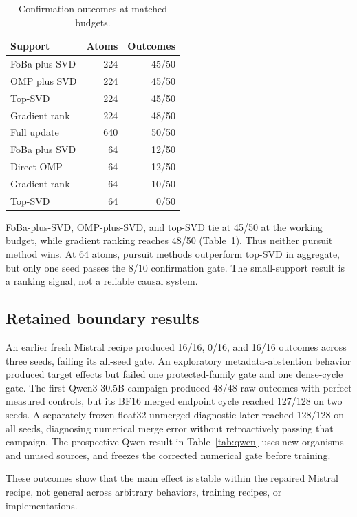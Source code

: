 \documentclass[10pt,twocolumn]{article}
\begin{document}
\begin{table}[t]
\centering
\small
\caption{Confirmation outcomes at matched budgets.}
\label{tab:selectors}
\begin{tabular}{lrr}
\toprule
Support & Atoms & Outcomes \\
\midrule
FoBa plus SVD & 224 & 45/50 \\
OMP plus SVD & 224 & 45/50 \\
Top-SVD & 224 & 45/50 \\
Gradient rank & 224 & 48/50 \\
Full update & 640 & 50/50 \\
\midrule
FoBa plus SVD & 64 & 12/50 \\
Direct OMP & 64 & 12/50 \\
Gradient rank & 64 & 10/50 \\
Top-SVD & 64 & 0/50 \\
\bottomrule
\end{tabular}
\end{table}

FoBa-plus-SVD, OMP-plus-SVD, and top-SVD tie at 45/50 at the working budget, while gradient ranking reaches 48/50 (Table~\ref{tab:selectors}). Thus neither pursuit method wins. At 64 atoms, pursuit methods outperform top-SVD in aggregate, but only one seed passes the 8/10 confirmation gate. The small-support result is a ranking signal, not a reliable causal system.

\subsection{Retained boundary results}

An earlier fresh Mistral recipe produced 16/16, 0/16, and 16/16 outcomes across three seeds, failing its all-seed gate. An exploratory metadata-abstention behavior produced target effects but failed one protected-family gate and one dense-cycle gate. The first Qwen3 30.5B campaign produced 48/48 raw outcomes with perfect measured controls, but its BF16 merged endpoint cycle reached 127/128 on two seeds. A separately frozen float32 unmerged diagnostic later reached 128/128 on all seeds, diagnosing numerical merge error without retroactively passing that campaign. The prospective Qwen result in Table~\ref{tab:qwen} uses new organisms and unused sources, and freezes the corrected numerical gate before training.

These outcomes show that the main effect is stable within the repaired Mistral recipe, not general across arbitrary behaviors, training recipes, or implementations.
\end{document}
